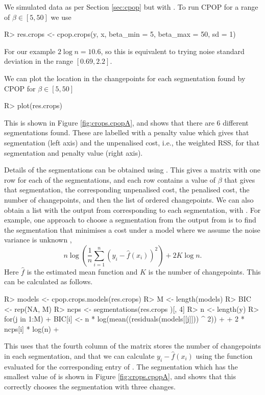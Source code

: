 \documentclass[article]{jss}
\begin{document}
We simulated data as per Section \ref{sec:cpop} but with . To run CPOP for a range of $\beta\in[5, 50]$ we use
\begin{CodeInput}
R> res.crops <- cpop.crops(y, x, beta_min = 5, beta_max = 50, sd = 1)
\end{CodeInput}
For our example $2 \log n = 10.6$, so this is equivalent to trying noise standard deviation in the range $[0.69,2.2]$. 

We can plot the location in the changepoints for each segmentation found by CPOP for $\beta\in[5,50]$
\begin{CodeInput}
R> plot(res.crops)
\end{CodeInput}
This is shown in Figure \ref{fig:crops.cpopA}, and shows that there are 6 different segmentations found. These are labelled with a penalty value which gives that segmentation (left axis) and the unpenalised cost, i.e., the weighted RSS, for that segmentation and penalty value (right axis).

Details of the segmentations can be obtained using . This gives a matrix with one row for each of the segmentations, and each row contains a value of $\beta$ that gives that segmentation, the corresponding unpenalised cost, the penalised cost, the number of changepoints, and then the list of ordered changepoints. 
%
%
We can also obtain a list with the output from  corresponding to each segmentation, with . For example, one approach to choose a segmentation from the output from  is to find the segmentation that minimises a cost under a model where we assume the noise variance is unknown \citep{fryzlewicz2014wild},
\[
 n \log \left( \frac{1}{n} \sum_{i=1}^n \left(y_i-\hat{f}(x_i)\right)^2
\right) + 2 K \log n.
\]
Here $\hat{f}$ is the estimated mean function and $K$ is the number of changepoints. This can be calculated as follows.
\begin{CodeChunk}
\begin{CodeInput}
R> models <- cpop.crops.models(res.crops)
R> M <- length(models)
R> BIC <- rep(NA, M)
R> ncps <- segmentations(res.crops )[, 4]
R> n <- length(y)
R> for(j in 1:M) {
+   BIC[i] <- n * log(mean((residuals(models[[j]])) ^ 2)) + 
+             2 * ncps[i] * log(n)
+ }
\end{CodeInput}
\end{CodeChunk}
This uses that the fourth column of the matrix  stores the number of changepoints in each segmentation, and that we can calculate $y_i - \hat{f}(x_i)$ using the  function evaluated for the corresponding entry of . The segmentation which has the smallest value of  is shown in Figure \ref{fig:crops.cpopA}, and shows that this correctly chooses the segmentation with three changes.
\end{document}
